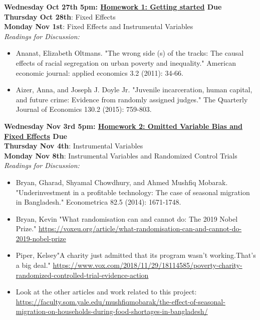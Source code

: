 \documentclass[a4paper, 10pt]{article}
\begin{document}
\noindent\textbf{Wednesday Oct 27th 5pm: \underline{Homework 1: Getting started} Due}\\

\noindent\textbf{Thursday Oct 28th}: Fixed Effects\\


\noindent\textbf{Monday Nov 1st}: Fixed Effects and Instrumental Variables\\
\textit{Readings for Discussion:}
\begin{itemize}
\item Ananat, Elizabeth Oltmans. "The wrong side (s) of the tracks: The causal effects of racial segregation on urban poverty and inequality." American economic journal: applied economics 3.2 (2011): 34-66. 
\item Aizer, Anna, and Joseph J. Doyle Jr. "Juvenile incarceration, human capital, and future crime: Evidence from randomly assigned judges." The Quarterly Journal of Economics 130.2 (2015): 759-803.
\end{itemize}

\noindent\textbf{Wednesday Nov 3rd 5pm: \underline{Homework 2: Omitted Variable Bias and Fixed Effects} Due}\\

\noindent\textbf{Thursday Nov 4th}: Instrumental Variables\\

\noindent\textbf{Monday Nov 8th}: Instrumental Variables and Randomized Control Trials\\
\textit{Readings for Discussion:}
\begin{itemize}

\item Bryan, Gharad, Shyamal Chowdhury, and Ahmed Mushfiq Mobarak. "Underinvestment in a profitable technology: The case of seasonal migration in Bangladesh." Econometrica 82.5 (2014): 1671-1748.
\item Bryan, Kevin "What randomisation can and cannot do: The 2019 Nobel Prize." \href{ https://voxeu.org/article/what-randomisation-can-and-cannot-do-2019-nobel-prize}{ https://voxeu.org/article/what-randomisation-can-and-cannot-do-2019-nobel-prize}
\item Piper, Kelsey"A charity just admitted that its program wasn't working.That's a big deal." \href{ https://www.vox.com/2018/11/29/18114585/poverty-charity-randomized-controlled-trial-evidence-action}{ https://www.vox.com/2018/11/29/18114585/poverty-charity-randomized-controlled-trial-evidence-action}
\item Look at the other articles and work related to this project:\href{ https://faculty.som.yale.edu/mushfiqmobarak/the-effect-of-seasonal-migration-on-households-during-food-shortages-in-bangladesh/}{ https://faculty.som.yale.edu/mushfiqmobarak/the-effect-of-seasonal-migration-on-households-during-food-shortages-in-bangladesh/} 
\end{itemize}
\end{document}
